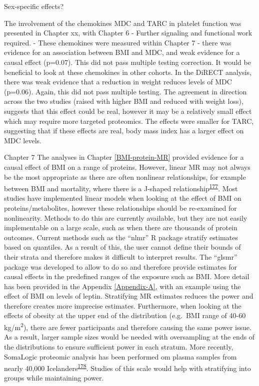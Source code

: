 \documentclass[11pt,twoside]{bristolthesis}
\begin{document}
Sex-specific effects?

The involvement of the chemokines MDC and TARC in platelet function was presented in Chapter xx, with
Chapter 6
- Further signaling and functional work required.
- These chemokines were measured within Chapter 7 - there was evidence for an association between BMI and MDC, and weak evidence for a causal effect (p=0.07). This did not pass multiple testing correction. It would be beneficial to look at these chemokines in other cohorts. In the DiRECT analysis, there was weak evidence that a reduction in weight reduces levels of MDC (p=0.06). Again, this did not pass multiple testing. The agreement in direction across the two studies (raised with higher BMI and reduced with weight loss), suggests that this effect could be real, however it may be a relatively small effect which may require more targeted proteomics. The effects were smaller for TARC, suggesting that if these effects are real, body mass index has a larger effect on MDC levels.

Chapter 7
The analyses in Chapter \ref{BMI-protein-MR} provided evidence for a causal effect of BMI on a range of proteins. However, linear MR may not always be the most appropriate as there are often nonlinear relationships, for example between BMI and mortality, where there is a J-shaped relationship\textsuperscript{\protect\hyperlink{ref-Sun2019}{177}}. Most studies have implemented linear models when looking at the effect of BMI on proteins/metabolites, however these relationships should be re-examined for nonlinearity. Methods to do this are currently available, but they are not easily implementable on a large scale, such as when there are thousands of protein outcomes. Current methods such as the ``nlmr'' R package stratify estimates based on quantiles. As a result of this, the user cannot define their bounds of their strata and therefore makes it difficult to interpret results. The ``glsmr'' package was developed to allow to do so and therefore provide estimates for causal effects in the predefined ranges of the exposure such as BMI. More detail has been provided in the Appendix \ref{Appendix-A}, with an example using the effect of BMI on levels of leptin. Stratifying MR estimates reduces the power and therefore creates more imprecise estimates. Furthermore, when looking at the effects of obesity at the upper end of the distribution (e.g.~BMI range of 40-60 kg/m\textsuperscript{2}), there are fewer participants and therefore causing the same power issue. As a result, larger sample sizes would be needed with oversampling at the ends of the distributions to ensure sufficient power in each stratum. More recently, SomaLogic proteomic analysis has been performed om plasma samples from nearly 40,000 Icelanders\textsuperscript{\protect\hyperlink{ref-Ferkingstad2021}{178}}. Studies of this scale would help with stratifying into groups while maintaining power.
\end{document}
